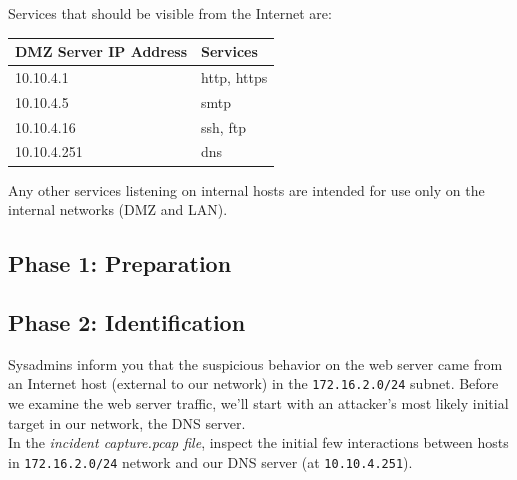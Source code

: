 \documentclass{article}
\begin{document}
Services that should be visible from the Internet are:\\

\begin{table}[ht]
\centering
\label{my-label}
\begin{tabular}{|l|l|}
\hline
\textbf{DMZ Server IP Address} & \textbf{Services} \\ \hline
10.10.4.1                      & http, https       \\ \hline
10.10.4.5                      & smtp              \\ \hline
10.10.4.16                     & ssh, ftp          \\ \hline
10.10.4.251                    & dns               \\ \hline
\end{tabular}
\end{table}

Any other services listening on internal hosts are intended for use only on the internal networks (DMZ and LAN).

\subsection{Phase 1: Preparation}


\subsection{Phase 2: Identification}
Sysadmins inform you that the suspicious behavior on the web server came from an Internet host (external to our network) in the {\tt 172.16.2.0/24} subnet. Before we examine the web server traffic, we'll start with an attacker's most likely initial target in our network, the DNS server.\\


In the \textit{incident capture.pcap file}, inspect the initial few interactions between hosts in {\tt 172.16.2.0/24}
network and our DNS server (at {\tt 10.10.4.251}).


\end{document}
